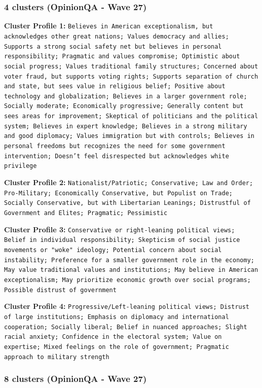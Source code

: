 \documentclass[11pt]{article}
\begin{document}
\subsubsection{4 clusters (OpinionQA - Wave 27)}

\textbf{Cluster Profile 1:} \texttt{Believes in American exceptionalism, but acknowledges other great nations; Values democracy and allies; Supports a strong social safety net but believes in personal responsibility; Pragmatic and values compromise; Optimistic about social progress; Values traditional family structures; Concerned about voter fraud, but supports voting rights; Supports separation of church and state, but sees value in religious belief; Positive about technology and globalization; Believes in a larger government role; Socially moderate; Economically progressive; Generally content but sees areas for improvement; Skeptical of politicians and the political system; Believes in expert knowledge; Believes in a strong military and good diplomacy; Values immigration but with controls; Believes in personal freedoms but recognizes the need for some government intervention; Doesn't feel disrespected but acknowledges white privilege}

\textbf{Cluster Profile 2:} \texttt{Nationalist/Patriotic; Conservative; Law and Order; Pro-Military; Economically Conservative, but Populist on Trade; Socially Conservative, but with Libertarian Leanings; Distrustful of Government and Elites; Pragmatic; Pessimistic}

\textbf{Cluster Profile 3:} \texttt{Conservative or right-leaning political views; Belief in individual responsibility; Skepticism of social justice movements or "woke" ideology; Potential concern about social instability; Preference for a smaller government role in the economy; May value traditional values and institutions; May believe in American exceptionalism; May prioritize economic growth over social programs; Possible distrust of government}

\textbf{Cluster Profile 4:} \texttt{Progressive/Left-leaning political views; Distrust of large institutions; Emphasis on diplomacy and international cooperation; Socially liberal; Belief in nuanced approaches; Slight racial anxiety; Confidence in the electoral system; Value on expertise; Mixed feelings on the role of government; Pragmatic approach to military strength}

\subsubsection{8 clusters (OpinionQA - Wave 27)}
\end{document}
